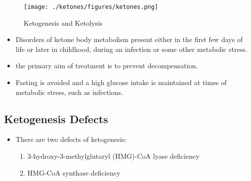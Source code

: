 \documentclass{scrartcl}
\begin{document}
\begin{figure}[htbp]
\centering
\texttt{[image: ./ketones/figures/ketones.png]}
\caption{\label{fig:orged67f3f}
Ketogenesis and Ketolysis}
\end{figure}

\begin{itemize}
\item Disorders of ketone body metabolism present either in the first few
days of life or later in childhood, during an infection or some
other metabolic stress.
\item the primary aim of treatment is to prevent decompensation.
\item Fasting is avoided and a high glucose intake is maintained at times
of metabolic stress, such as infections.
\end{itemize}

\subsection{Ketogenesis Defects}
\label{sec:org1c8e872}
\begin{itemize}
\item There are two defects of ketogenesis:
\begin{enumerate}
\item 3-hydroxy-3-methylglutaryl (HMG)-CoA lyase deficiency
\item HMG-CoA synthase deficiency
\end{enumerate}
\end{itemize}
\end{document}
